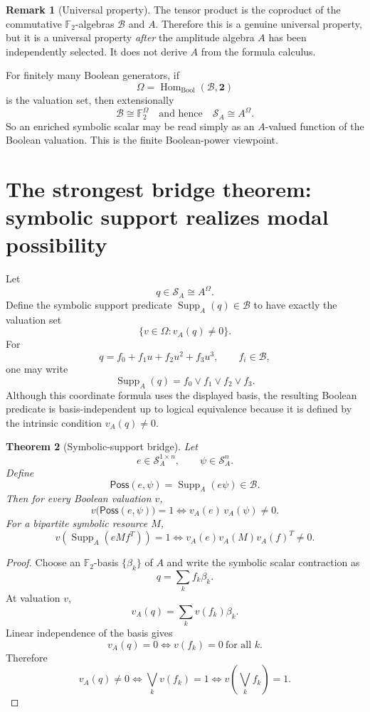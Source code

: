 \documentclass[11pt]{article}
\newtheorem{theorem}{Theorem}[section]
\theoremstyle{definition}
\newtheorem{remark}[theorem]{Remark}
\newcommand{\F}{\mathbb{F}}
\newcommand{\B}{\mathcal{B}}
\newcommand{\Sring}{\mathcal{S}_A}
\newcommand{\Poss}{\mathsf{Poss}}
\newcommand{\Supp}{\operatorname{Supp}_A}
\newcommand{\Bool}{\mathbf{2}}
\begin{document}
\begin{remark}[Universal property]
The tensor product is the coproduct of the commutative \(\F_2\)-algebras \(\B\) and \(A\).
Therefore this is a genuine universal property, but it is a universal property \emph{after} the amplitude
algebra \(A\) has been independently selected. It does not derive \(A\) from the formula calculus.
\end{remark}

For finitely many Boolean generators, if
\[
\Omega=\operatorname{Hom}_{\mathrm{Bool}}(\B,\Bool)
\]
is the valuation set, then extensionally
\[
\B\cong\F_2^{\Omega}
\quad\text{and hence}\quad
\boxed{\Sring\cong A^{\Omega}.}
\]
So an enriched symbolic scalar may be read simply as an \(A\)-valued function of the Boolean
valuation. This is the finite Boolean-power viewpoint.

\section{The strongest bridge theorem: symbolic support realizes modal possibility}

Let
\[
q\in\Sring\cong A^{\Omega}.
\]
Define the symbolic support predicate \(\Supp(q)\in\B\) to have exactly the valuation set
\[
\{v\in\Omega: v_A(q)\neq0\}.
\]
For
\[
q=f_0+f_1u+f_2u^2+f_3u^3,
\qquad f_i\in\B,
\]
one may write
\[
\Supp(q)=f_0\lor f_1\lor f_2\lor f_3.
\]
Although this coordinate formula uses the displayed basis, the resulting Boolean predicate is
basis-independent up to logical equivalence because it is defined by the intrinsic condition
\(v_A(q)\neq0\).

\begin{theorem}[Symbolic-support bridge]
Let
\[
e\in\Sring^{1\times n},\qquad \psi\in\Sring^n.
\]
Define
\[
\Poss(e,\psi)=\Supp(e\psi)\in\B.
\]
Then for every Boolean valuation \(v\),
\[
\boxed{
v\bigl(\Poss(e,\psi)\bigr)=1
\iff
v_A(e)\,v_A(\psi)\neq0.}
\]
For a bipartite symbolic resource \(M\),
\[
\boxed{
v\left(\Supp(eMf^T)\right)=1
\iff
v_A(e)v_A(M)v_A(f)^T\neq0.}
\]
\end{theorem}

\begin{proof}
Choose an \(\F_2\)-basis \(\{\beta_k\}\) of \(A\) and write the symbolic scalar contraction as
\[
q=\sum_k f_k\beta_k.
\]
At valuation \(v\),
\[
v_A(q)=\sum_k v(f_k)\beta_k.
\]
Linear independence of the basis gives
\[
v_A(q)=0\iff v(f_k)=0\ \text{for all }k.
\]
Therefore
\[
v_A(q)\neq0
\iff
\bigvee_kv(f_k)=1
\iff
v\left(\bigvee_k f_k\right)=1.
\]
\end{proof}
\end{document}
